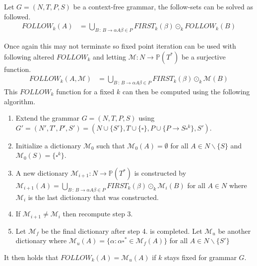 \begin{algorithm}
    Let $G = (N, T, P, S)$ be a context-free grammar, the follow-sets can be solved as followed.
    \begin{align*}
        FOLLOW_k(A) &= \bigcup_{B \, : \, B \to \alpha A \beta \in P} FIRST_k(\beta) \odot_k FOLLOW_k(B)
    \end{align*}
\end{algorithm}
\noindent Once again this may not terminate so fixed point iteration can be used with following altered $FOLLOW_k$ and letting $\mathcal{M}: N \to \mathbb{P}(T^*)$ be a surjective function.
\begin{align*}
    FOLLOW_k(A, \mathcal{M}) &= \bigcup_{B \,: \, B \to \alpha A \beta \in P} FIRST_k(\beta) \odot_k \mathcal{M}(B)
\end{align*}
This $FOLLOW_k$ function for a fixed $k$ can then be computed using the following algorithm.
\begin{enumerate}
    \item Extend the grammar $G = (N, T, P, S)$ using $G' = (N', T', P', S') = (N \cup \{S'\}, T \cup \{\square\}, P \cup \{P \to S \square^k\}, S')$.
    \item Initialize a dictionary $\mathcal{M}_0$ such that $\mathcal{M}_0(A) = \emptyset$ for all $A \in N \backslash \{S\}$ and $\mathcal{M}_0(S) = \{\square^k\}$.
    \item A new dictionary $\mathcal{M}_{i+1}: N \to \mathbb{P}(T^*)$ is constructed by $\mathcal{M}_{i+1}(A) = \bigcup_{B \,: \, B \to  \alpha A \beta \in P} FIRST_k(\beta) \odot_k \mathcal{M}_{i}(B)$ for all $A \in N$ where $\mathcal{M}_{i}$ is the last dictionary that was constructed.
    \item If $\mathcal{M}_{i+1} \neq \mathcal{M}_{i}$ then recompute step 3.
    \item Let $\mathcal{M}_f$ be the final dictionary after step 4. is completed. Let $\mathcal{M}_u$ be another dictionary where $\mathcal{M}_u(A) = \{\alpha : \alpha \square^* \in \mathcal{M}_f(A)\}$ for all $A \in N \backslash \{S'\}$ 
\end{enumerate}
It then holds that $FOLLOW_k(A) = \mathcal{M}_u(A)$ if $k$ stays fixed for grammar $G$.